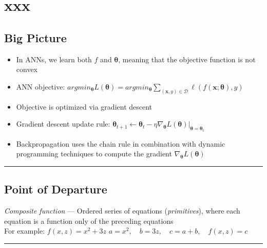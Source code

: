 \section{xxx}
\subsection*{Big Picture}
\begin{itemize}
    \item In ANNs, we learn both $f$ and $\boldsymbol{\theta}$, meaning that the objective function is not convex
    \item ANN objective: 
    $
    argmin_{\boldsymbol{\theta}} L(\boldsymbol{\theta}) = argmin_{\boldsymbol{\theta}} \sum_{(\boldsymbol{x}, y) \in \mathcal{D}} \ell(f(\boldsymbol{x}; \boldsymbol{\theta}), y)
    $
    \item Objective is optimized via gradient descent
    \item Gradient descent update rule: 
    $
    \boldsymbol{\theta}_{t+1} \gets \boldsymbol{\theta}_t - \eta \nabla_{\boldsymbol{\theta}} L(\boldsymbol{\theta}) \big|_{\boldsymbol{\theta} = \boldsymbol{\theta}_t}
    $
    \item Backpropagation uses the chain rule in combination with dynamic programming techniques to compute the gradient $\nabla_{\boldsymbol{\theta}} L(\boldsymbol{\theta})$
\end{itemize}

{\color{black}\hrule height 0.001mm}

\subsection*{Point of Departure}

\emph{Composite function} --- Ordered series of equations (\emph{primitives}), where each equation is a function only of the preceding equations\\
For example:
$
f(x, z) = x^2 + 3z
$
$
a = x^2, \quad b = 3z, \quad c = a + b, \quad f(x, z) = c
$

{\color{lightgray}\hrule height 0.001mm}

